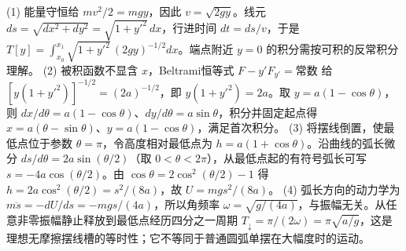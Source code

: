 (1) 能量守恒给 \(mv^2/2=mgy\)，因此 \(v=\sqrt{2gy}\)。线元 \(ds=\sqrt{dx^2+dy^2}=\sqrt{1+y'^2}\,dx\)，行进时间 \(dt=ds/v\)，于是 \(T[y]=\int_{x_0}^{x_1}\sqrt{1+y'^2}\,(2gy)^{-1/2}dx\)。端点附近 \(y=0\) 的积分需按可积的反常积分理解。
(2) 被积函数不显含 \(x\)，Beltrami恒等式 \(F-y'F_{y'}=\text{常数}\) 给 \([y(1+y'^2)]^{-1/2}=(2a)^{-1/2}\)，即 \(y(1+y'^2)=2a\)。取 \(y=a(1-\cos\theta)\)，则 \(dx/d\theta=a(1-\cos\theta)\)、\(dy/d\theta=a\sin\theta\)，积分并固定起点得 \(x=a(\theta-\sin\theta)\)、\(y=a(1-\cos\theta)\)，满足首次积分。
(3) 将摆线倒置，使最低点位于参数 \(\theta=\pi\)，令高度相对最低点为 \(h=a(1+\cos\theta)\)。沿曲线的弧长微分 \(ds/d\theta=2a\sin(\theta/2)\)（取 \(0<\theta<2\pi\)），从最低点起的有符号弧长可写 \(s=-4a\cos(\theta/2)\)。由 \(\cos\theta=2\cos^2(\theta/2)-1\) 得 \(h=2a\cos^2(\theta/2)=s^2/(8a)\)，故 \(U=mgs^2/(8a)\)。
(4) 弧长方向的动力学为 \(m\ddot s=-dU/ds=-mgs/(4a)\)，所以角频率 \(\omega=\sqrt{g/(4a)}\)，与振幅无关。从任意非零振幅静止释放到最低点经历四分之一周期 \(T_{\downarrow}=\pi/(2\omega)=\pi\sqrt{a/g}\)，这是理想无摩擦摆线槽的等时性；它不等同于普通圆弧单摆在大幅度时的运动。
